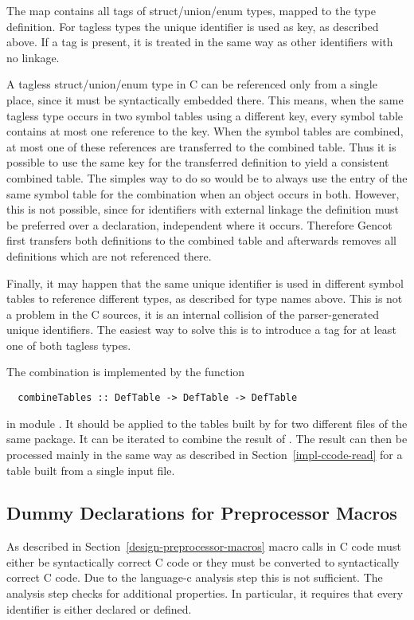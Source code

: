 The map  contains all tags of struct/union/enum types, mapped to the type definition. For tagless types
the unique identifier is used as key, as described above. If a tag is present, it is treated in the same way as other 
identifiers with no linkage.

A tagless struct/union/enum type in C can be referenced only from a single place, since it must be syntactically embedded
there. This means, when the same tagless type occurs in two symbol tables using a different key, every symbol table
contains at most one reference to the key. When the symbol tables are combined, at most one of these references are transferred
to the combined table. Thus it is possible to use the same key for the transferred definition to yield a consistent
combined table. The simples way to do so would be to always use the entry of the same symbol table for the combination 
when an object occurs in both. However, this is not possible, since for identifiers with external linkage the definition
must be preferred over a declaration, independent where it occurs. Therefore Gencot first transfers both definitions to the 
combined table and afterwards removes all definitions which are not referenced there.

Finally, it may happen that the same unique identifier is used in different symbol tables to reference different types, 
as described for type names above. This is not a problem in the C sources, it is an internal collision of the parser-generated 
unique identifiers. The easiest way to solve this is to introduce a tag for at least one of both tagless types.

The combination is implemented by the function
\begin{verbatim}
  combineTables :: DefTable -> DefTable -> DefTable
\end{verbatim}
in module . It should be applied to the tables built by  for two different
 files of the same package. It can be iterated to combine the result of .
The result can then be processed mainly in the same way as described in 
Section~\ref{impl-ccode-read} for a table built from a single input file.

\subsection{Dummy Declarations for Preprocessor Macros}
\label{impl-ccode-dummydecl}

As described in Section~\ref{design-preprocessor-macros} macro calls in C code must either be syntactically correct
C code or they must be converted to syntactically correct C code. Due to the language-c analysis step this is not 
sufficient. The analysis step checks for additional properties. In particular, it requires that every identifier 
is either declared or defined.

